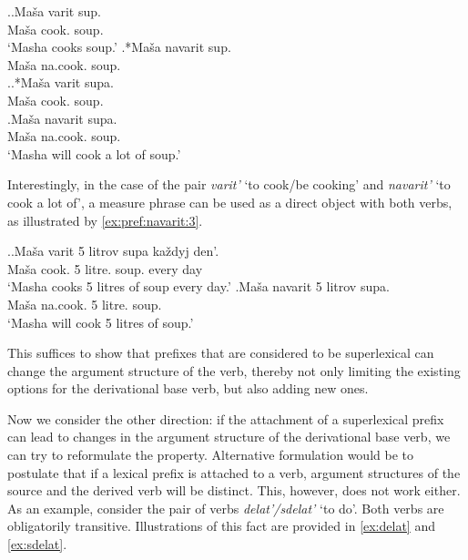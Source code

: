 \ex.\label{ex:pref:navarit:1}\ag.\label{ex:varit:1}Ma\v{s}a varit\textsuperscript{\IPF} sup.\\
Ma\v{s}a cook. soup.\\
\trans `Masha cooks soup.'
\bg.*Ma\v{s}a navarit\textsuperscript{\PF} sup.\label{ex:navarit1}\\
Ma\v{s}a na.cook. soup.\\

\ex.\label{ex:pref:navarit:2}\ag.*Ma\v{s}a varit\textsuperscript{\IPF} supa.\label{ex:varit2}\\
Ma\v{s}a cook. soup.\\
\bg.\label{ex:navarit2}Ma\v{s}a navarit\textsuperscript{\PF} supa.\\
Ma\v{s}a na.cook. soup.\\
\trans `Masha will cook a lot of soup.'

Interestingly, in the case of the pair \textit{varit'}\textsuperscript{\IPF} `to cook/be cooking' and \textit{navarit'}\textsuperscript{\PF} `to cook a lot of', a measure phrase can be used as a direct object with both verbs, as illustrated by \ref{ex:pref:navarit:3}.

\ex.\label{ex:pref:navarit:3}\ag.\label{ex:varit3}Ma\v{s}a varit\textsuperscript{\IPF} 5 litrov supa ka\v{z}dyj den'.\\
Ma\v{s}a cook. 5 litre. soup. every day\\
\trans `Masha cooks 5 litres of soup every day.'
\bg.\label{ex:navarit3}Ma\v{s}a navarit\textsuperscript{\PF} 5 litrov supa.\\
Ma\v{s}a na.cook. 5 litre. soup.\\
\trans `Masha will cook 5 litres of soup.'

This suffices to show that prefixes that are considered to be superlexical can change the argument structure of the verb, thereby not only limiting the existing options for the derivational base verb, but also adding new ones.

Now we consider the other direction: if the attachment of a superlexical prefix can lead to changes in the argument structure of the derivational base verb, we can try to reformulate the property. Alternative formulation would be to postulate that if a lexical prefix is attached to a verb, argument structures of the source and the derived verb will be distinct. This, however, does not work either. As an example, consider the pair of verbs \textit{delat'/sdelat'} `to do'. Both verbs are obligatorily transitive. Illustrations of this fact are provided in \ref{ex:delat} and \ref{ex:sdelat}.

